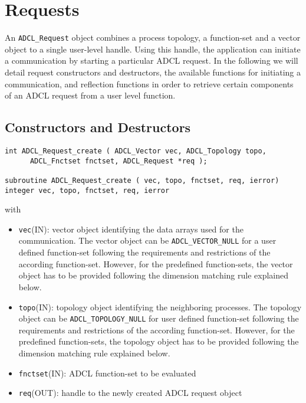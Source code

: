 \section{Requests}

An {\tt ADCL\_Request} object combines a process topology, a function-set and
a vector object to a single user-level handle. Using this handle, the
application can initiate a communication by starting a particular ADCL
request. In the following we will detail request constructors and destructors,
the available functions for initiating a communication, and reflection
functions in order to retrieve certain components of an ADCL request from a
user level function.

\subsection{Constructors and Destructors}

\begin{verbatim}
int ADCL_Request_create ( ADCL_Vector vec, ADCL_Topology topo, 
      ADCL_Fnctset fnctset, ADCL_Request *req );

subroutine ADCL_Request_create ( vec, topo, fnctset, req, ierror)
integer vec, topo, fnctset, req, ierror
\end{verbatim}
with
\begin{itemize}
\item {\tt vec}(IN): vector object identifying the data arrays used for the
  communication. The vector object can be {\tt ADCL\_VECTOR\_NULL} for a user
  defined function-set following the requirements and restrictions of the
  according function-set. However, for the predefined function-sets, the
  vector object has to be provided following the dimension matching rule
  explained below.
\item {\tt topo}(IN): topology object identifying the neighboring processes.
  The topology object can be {\tt ADCL\_TOPOLOGY\_NULL} for user defined
  function-set following the requirements and restrictions of the according
  function-set. However, for the predefined function-sets, the topology object
  has to be provided following the dimension matching rule explained below.
\item {\tt fnctset}(IN): ADCL function-set to be evaluated
\item {\tt req}(OUT): handle to the newly created ADCL request object
\end{itemize}
\hspace{1cm}

